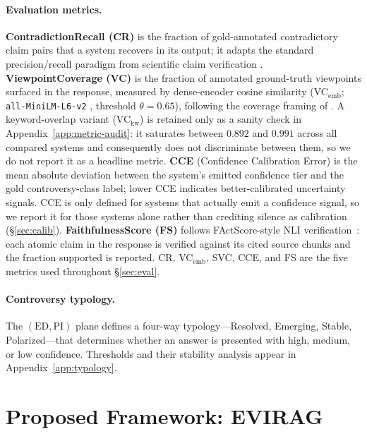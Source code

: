 \documentclass[11pt]{article}
\newcommand{\system}{\textsc{EVIRAG}\xspace}
\begin{document}
\paragraph{Evaluation metrics.}
\textbf{ContradictionRecall (CR)} is the fraction of gold-annotated
contradictory claim pairs that a system recovers in its output; it adapts
the standard precision/recall paradigm from scientific claim verification
\citep{wadden2020scifact}.
\textbf{ViewpointCoverage (VC)} is the fraction of annotated ground-truth
viewpoints surfaced in the response, measured by dense-encoder cosine
similarity (VC$_\text{emb}$; \texttt{all-MiniLM-L6-v2}
\citep{reimers2019sentence}, threshold $\theta{=}0.65$), following the
coverage framing of \citet{malaviya2024expertqa}.  A keyword-overlap variant
(VC$_\text{kw}$) is retained only as a sanity check in
Appendix~\ref{app:metric-audit}: it saturates between $0.892$ and $0.991$
across all compared systems and consequently does not discriminate between
them, so we do not report it as a headline metric.
\textbf{CCE} (Confidence Calibration Error) is the mean absolute deviation
between the system's emitted confidence tier and the gold controversy-class
label; lower CCE indicates better-calibrated uncertainty signals.  CCE is
only defined for systems that actually emit a confidence signal, so we report
it for those systems alone rather than crediting silence as calibration
(\S\ref{sec:calib}).
\textbf{FaithfulnessScore (FS)} follows FActScore-style NLI
verification~\citep{min2023factscore}: each atomic claim in the response is
verified against its cited source chunks and the fraction supported is
reported.  CR, VC$_\text{emb}$, SVC, CCE, and FS are the five metrics used
throughout \S\ref{sec:eval}.

\paragraph{Controversy typology.}
\label{sec:taxonomy}
The $(\mathrm{ED},\mathrm{PI})$ plane defines a four-way typology---Resolved,
Emerging, Stable, Polarized---that determines whether an answer is presented
with high, medium, or low confidence.  Thresholds and their stability analysis
appear in Appendix~\ref{app:typology}.

\section{Proposed Framework: \system}
\label{sec:system}
\end{document}
